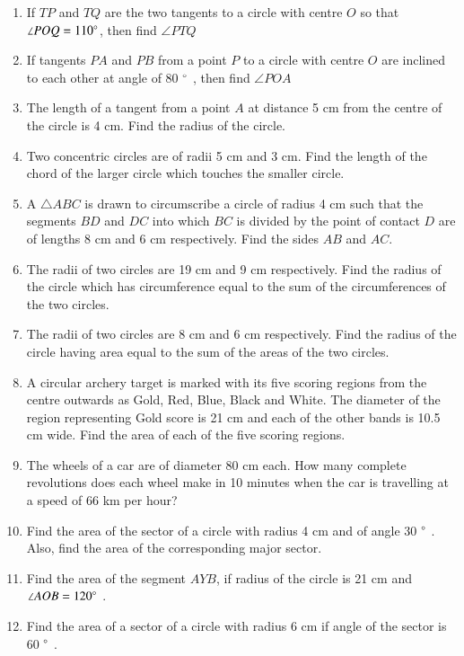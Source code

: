 \begin{enumerate}[label=\arabic*.,ref=\thesubsection.\theenumi]
\item  If $TP$ and $TQ$ are the two tangents to a circle with centre $O$ so that  $\angle  POQ = 110 \degree $, then find  $\angle  PTQ$
\item  If tangents $PA$ and $PB$ from a point $P$ to a circle with centre $O$ are inclined to each other at angle of 80 $\degree$ , then find  $\angle  POA $
%
\item The length of a tangent from a point $A$ at distance 5 cm from the centre of the circle is 4 cm. Find the radius of the circle.
\item  Two concentric circles are of radii 5 cm and 3 cm. Find the length of the chord of the larger circle which touches the smaller circle.
%
\item A $\triangle ABC$ is drawn to circumscribe a circle of radius 4 cm such that the segments $BD$ and $DC$ into which $BC$ is divided by the point of contact $D$ are of lengths 8 cm and 6 cm respectively. Find the sides $AB$ and $AC$.
%

\item The radii of two circles are 19 cm and 9 cm respectively. Find the radius of the circle which has circumference equal to the sum of the circumferences of the two circles.
\item The radii of two circles are 8 cm and 6 cm respectively. Find the radius of the circle having area equal to the sum of the areas of the two circles.
\item A circular  archery target is marked with its five scoring regions from the centre outwards as Gold, Red, Blue, Black and White. The diameter of the region representing Gold score is 21 cm and each of the other bands is 10.5 cm wide. Find the area of each of the five scoring regions.
\item The wheels of a car are of diameter 80 cm each. How many complete revolutions does each wheel make in 10 minutes when the car is travelling at a speed of 66 km per hour?
%
 \item Find the area of the sector of a circle with radius 4 cm and of angle 30 $\degree$ . Also, find the area of the corresponding major sector.
\item Find the area of the segment $AYB$, if radius of the circle is 21 cm and
 $\angle  AOB = 120 \degree$ .
%
\item Find the area of a sector of a circle with radius 6 cm if angle of the sector is 60 $\degree$ . 

\end{enumerate}
